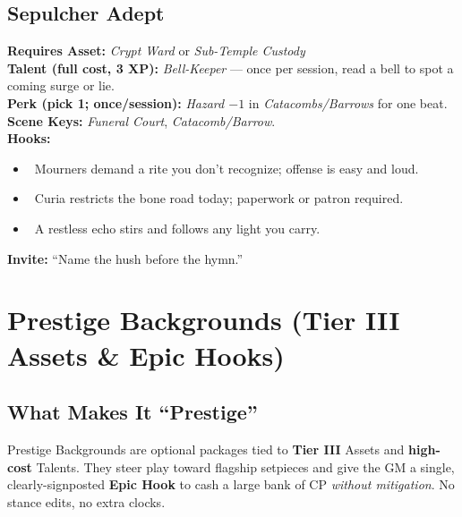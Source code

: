 \documentclass[11pt]{article}
\begin{document}
\subsection*{Sepulcher Adept}
\textbf{Requires Asset:} \emph{Crypt Ward} or \emph{Sub-Temple Custody}\\
\textbf{Talent (full cost, 3 XP):} \emph{Bell-Keeper} — once per session, read a bell to spot a coming surge or lie.\\
\textbf{Perk (pick 1; once/session):} \emph{Hazard $-1$} in \emph{Catacombs/Barrows} for one beat.\\
\textbf{Scene Keys:} \emph{Funeral Court}, \emph{Catacomb/Barrow}.\\[2pt]
\textbf{Hooks:}
\begin{itemize}
  \item \heartsuit~Mourners demand a rite you don’t recognize; offense is easy and loud.
  \item \clubsuit~Curia restricts the bone road today; paperwork or patron required.
  \item \spadesuit~A restless echo stirs and follows any light you carry.
\end{itemize}
\textbf{Invite:} “Name the hush before the hymn.”

\section*{Prestige Backgrounds (Tier III Assets \& Epic Hooks)}

\subsection*{What Makes It “Prestige”}
Prestige Backgrounds are optional packages tied to \textbf{Tier III} Assets and \textbf{high-cost} Talents. They steer play toward flagship setpieces and give the GM a single, clearly-signposted \textbf{Epic Hook} to cash a large bank of CP \emph{without mitigation}. No stance edits, no extra clocks.
\end{document}
